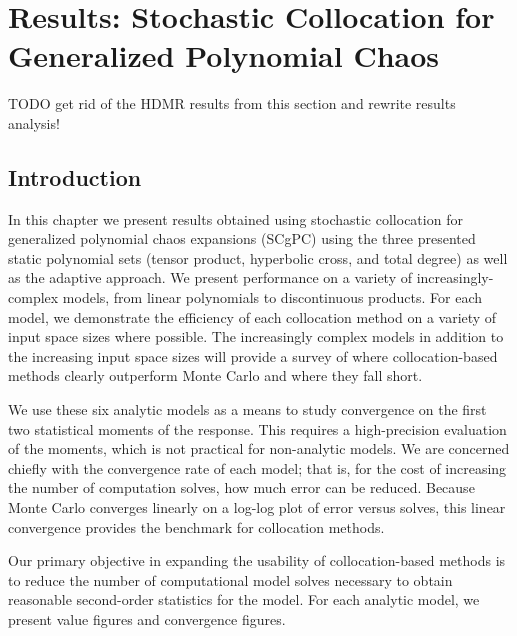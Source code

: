 
\chapter{Results: Stochastic Collocation for Generalized Polynomial Chaos} %

\label{ch:results scgpc} %



TODO get rid of the HDMR results from this section and rewrite results analysis!
\section{Introduction}
In this chapter we present results obtained using stochastic collocation for generalized polynomial chaos
expansions (SCgPC) using the three presented static polynomial sets (tensor product, hyperbolic cross, and
total degree) as well as the adaptive approach.  We present performance on a variety of increasingly-complex
models, from linear polynomials to discontinuous products.  For each model, we demonstrate the
efficiency of each collocation method on a variety of input space sizes where possible.  The increasingly
complex models in addition to the increasing input space sizes will provide a survey of where
collocation-based methods clearly outperform Monte Carlo and where they fall short.

We use these six analytic models as a means to study convergence on the first two statistical moments of the
response.  This requires a high-precision evaluation of the moments, which is not practical for non-analytic
models.  We are concerned chiefly with the convergence rate of each model; that is, for the cost of increasing
the number of computation solves, how much error can be reduced.  Because Monte Carlo converges linearly on a
log-log plot of error versus solves, this linear convergence provides the benchmark for collocation methods.

Our primary objective in expanding the usability of collocation-based methods is to reduce the number of
computational model solves necessary to obtain reasonable second-order statistics for the model.  For each
analytic model, we present value figures and convergence figures.  

